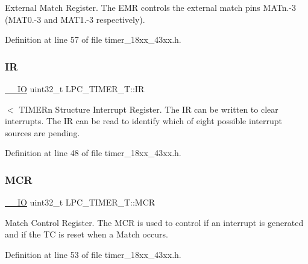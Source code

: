 External Match Register. The E\+MR controls the external match pins M\+A\+Tn.-\/3 (M\+A\+T0.-\/3 and M\+A\+T1.-\/3 respectively). 

Definition at line 57 of file timer\+\_\+18xx\+\_\+43xx.\+h.

\mbox{\label{struct_l_p_c___t_i_m_e_r___t_a3db61fe5ab56aeea0c27c6199da63b1a}} 
\subsubsection{\texorpdfstring{IR}{IR}}
{\footnotesize\ttfamily \hyperlink{core__sc300_8h_aec43007d9998a0a0e01faede4133d6be}{\+\_\+\+\_\+\+IO} uint32\+\_\+t L\+P\+C\+\_\+\+T\+I\+M\+E\+R\+\_\+\+T\+::\+IR}

$<$ T\+I\+M\+E\+Rn Structure Interrupt Register. The IR can be written to clear interrupts. The IR can be read to identify which of eight possible interrupt sources are pending. 

Definition at line 48 of file timer\+\_\+18xx\+\_\+43xx.\+h.

\mbox{\label{struct_l_p_c___t_i_m_e_r___t_a7696d9896a932a78d6a6a60488332674}} 
\subsubsection{\texorpdfstring{M\+CR}{MCR}}
{\footnotesize\ttfamily \hyperlink{core__sc300_8h_aec43007d9998a0a0e01faede4133d6be}{\+\_\+\+\_\+\+IO} uint32\+\_\+t L\+P\+C\+\_\+\+T\+I\+M\+E\+R\+\_\+\+T\+::\+M\+CR}

Match Control Register. The M\+CR is used to control if an interrupt is generated and if the TC is reset when a Match occurs. 

Definition at line 53 of file timer\+\_\+18xx\+\_\+43xx.\+h.

\mbox{\label{struct_l_p_c___t_i_m_e_r___t_a26e8addd98189542175c5ecbcd8d3776}} 

